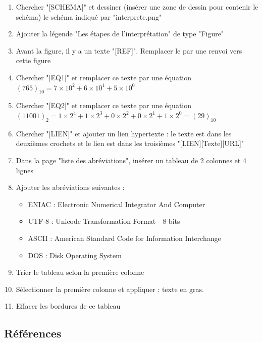 \documentclass[11pt, a4paper]{article}
\begin{document}
\begin{enumerate}
\begin{enumerate}
	\end{enumerate}
	\item Chercher "[SCHEMA]" et dessiner (insérer une zone de dessin pour contenir le schéma) le schéma indiqué par "interprete.png"
	\item Ajouter la légende "Les étapes de l'interprétation" de type "Figure"
	\item Avant la figure, il y a un texte "[REF]". Remplacer le par une renvoi vers cette figure
	\item Chercher "[EQ1]" et remplacer ce texte par une équation $ (765)_{10} = 7 \times 10^2 + 6 \times 10^1 + 5 \times 10^0 $
	\item Chercher "[EQ2]" et remplacer ce texte par une équation $ (11001)_{2} = 1 \times 2^4 + 1 \times 2^3 + 0 \times 2^2 + 0 \times 2^1 + 1 \times 2^0 = (29)_{10} $
	\item  Chercher "[LIEN]" et ajouter un lien hypertexte : le texte est dans les deuxièmes crochets et le lien est dans les troisièmes "[LIEN][Texte][URL]"
	\item Dans la page "liste des abréviations", insérer un tableau de 2 colonnes et 4 lignes
	\item Ajouter les abréviations suivantes : 
	\begin{multicols}{2}
		\begin{itemize}
			\item ENIAC : Electronic Numerical Integrator And Computer
			\item UTF-8 : Unicode Transformation Format - 8 bits
			\item ASCII : American Standard Code for Information Interchange
			\item DOS : Disk Operating System
		\end{itemize}
	\end{multicols}
	\item Trier le tableau selon la première colonne
	\item Sélectionner la première colonne et appliquer : texte en gras. 
	\item Effacer les bordures de ce tableau
\end{enumerate}

\subsection*{Références}
\end{document}
